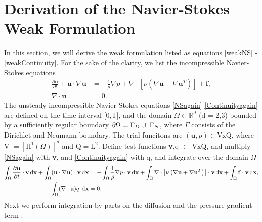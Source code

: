 \documentclass[11pt]{article}
\begin{document}
{%
\section{Derivation of the Navier-Stokes Weak Formulation}
In this section, we will derive the weak formulation listed as equations \eqref{weakNS} - 
\eqref{weakContinuity}.
For the sake of the clarity, we list the incompressible Navier-Stokes equations 
\begin{align}
\label{NSagain}
\frac{\partial\mathbf{u}}{\partial t} + \mathbf{u}\cdot\nabla \mathbf{u} &= 
-\frac{1}{\rho}  \nabla p  + 
\nabla \cdot \left[\nu \left(\nabla\mathbf{u} + \nabla\mathbf{u}^T \right)  \right]
+ \mathbf{f}, \\
\label{Continuityagain}
\nabla \cdot\mathbf{u} &= 0.
\end{align}
The unsteady incompressible Navier-Stokes equations \eqref{NSagain}-\eqref{Continuityagain} 
are defined on the time interval [0,T], and the domain $\Omega\subset\mathbb{R}^d $
(d = 2,3) bounded by a sufficiently regular boundary $\partial  \Omega = \Gamma_D \cup 
\hspace{1mm}\Gamma_N$, where $\Gamma$ consists of the Dirichlet and Neumann boundary.
The trial funcitons are $(\mathbf{u},p) \in\text{VxQ}$, where V $= [\text{H}^1(\Omega)]^d$ and 
Q$=\text{L}^2$. Define test functions \textbf{v},q $\in$ VxQ, and multiply \eqref{NSagain} with 
\textbf{v}, and \eqref{Continuityagain} with q, and integrate over the domain $\Omega$
\begin{align}
\label{derivationNS1}
\int_\Omega\frac{\partial\mathbf{u}}{\partial t} \cdot \mathbf{v}\,\mathrm d\mathbf{x} +
\int_\Omega (\mathbf{u}\cdot\nabla \mathbf{u}) \cdot \mathbf{v}\,\mathrm d\mathbf{x} &= 
-\int_\Omega \frac{1}{\rho}  \nabla p \cdot \mathbf{v}\,\mathrm d\mathbf{x}
+ \int_\Omega \nabla \cdot \left[\nu \left(\nabla\mathbf{u} + \nabla\mathbf{u}^T \right)  
\right] \cdot \mathbf{v}\,\mathrm d\mathbf{x}
+ \int_\Omega \mathbf{f} \cdot \mathbf{v}\,\mathrm d\mathbf{x},\\
\label{derivationContinuity1}
\int_\Omega (\nabla \cdot \mathbf{u}) q \hspace{1mm}\,\mathrm d\mathbf{x} &= 0.
\end{align}
Next we perform integration by parts on the diffusion and the pressure gradient term :
\begin{align}

\end{align}}
\end{document}
